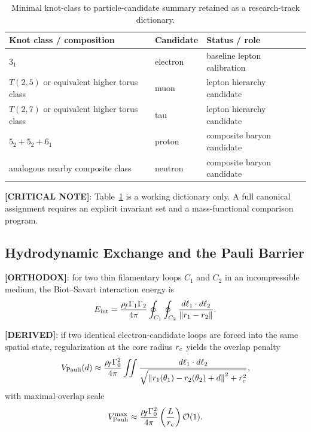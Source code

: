 \begin{table}[h]
\centering
\begin{tabular}{lll}
\hline
Knot class / composition & Candidate & Status / role \\
\hline
$3_1$ & electron & baseline lepton calibration \\
$T(2,5)$ or equivalent higher torus class & muon & lepton hierarchy candidate \\
$T(2,7)$ or equivalent higher torus class & tau & lepton hierarchy candidate \\
$5_2 + 5_2 + 6_1$ & proton & composite baryon candidate \\
analogous nearby composite class & neutron & composite baryon candidate \\
\hline
\end{tabular}
\caption{Minimal knot-class to particle-candidate summary retained as a research-track dictionary.}
\label{tab:particle-candidates}
\end{table}

\textbf{[CRITICAL NOTE]}: Table~\ref{tab:particle-candidates} is a working dictionary only. A full canonical assignment requires an explicit invariant set and a mass-functional comparison program.

\subsection{Hydrodynamic Exchange and the Pauli Barrier}
\textbf{[ORTHODOX]}: for two thin filamentary loops $C_1$ and $C_2$ in an incompressible medium, the Biot--Savart interaction energy is
\begin{align}
    E_{\mathrm{int}}
    =
    \frac{\rho_{\!f}\Gamma_1\Gamma_2}{4\pi}
    \oint_{C_1}\oint_{C_2}
    \frac{d\ell_1\cdot d\ell_2}{\norm{r_1-r_2}}.
\end{align}

\textbf{[DERIVED]}: if two identical electron-candidate loops are forced into the same spatial state, regularization at the core radius $r_c$ yields the overlap penalty
\begin{align}
    V_{\mathrm{Pauli}}(d)
    \approx
    \frac{\rho_{\!f}\Gamma_0^2}{4\pi}
    \iint
    \frac{d\ell_1\cdot d\ell_2}{\sqrt{\norm{r_1(\theta_1)-r_2(\theta_2)+d}^2+r_c^2}},
\end{align}
with maximal-overlap scale
\begin{align}
    V_{\mathrm{Pauli}}^{\max}
    \approx
    \frac{\rho_{\!f}\Gamma_0^2}{4\pi}\left(\frac{L}{r_c}\right)\mathcal{O}(1).
\end{align}

